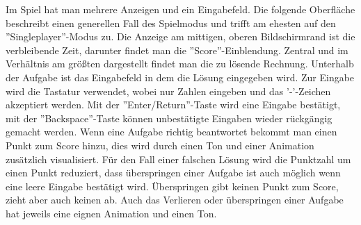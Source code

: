Im Spiel hat man mehrere Anzeigen und ein Eingabefeld. Die folgende Oberfläche beschreibt einen generellen Fall des Spielmodus und trifft am ehesten auf den ''Singleplayer''-Modus zu. Die Anzeige am mittigen, oberen Bildschirmrand ist die verbleibende Zeit, darunter findet man die ''Score''-Einblendung. Zentral und im Verhältnis am größten dargestellt findet man die zu lösende Rechnung. Unterhalb der Aufgabe ist das Eingabefeld in dem die Lösung eingegeben wird. Zur Eingabe wird die Tastatur verwendet, wobei nur Zahlen eingeben und das '-'-Zeichen akzeptiert werden. Mit der ''Enter/Return''-Taste wird eine Eingabe bestätigt, mit der ''Backspace''-Taste können unbestätigte Eingaben wieder rückgängig gemacht werden. Wenn eine Aufgabe richtig beantwortet bekommt man einen Punkt zum Score hinzu, dies wird durch einen Ton und einer Animation zusätzlich visualisiert. Für den Fall einer falschen Lösung wird die Punktzahl um einen Punkt reduziert, dass überspringen einer Aufgabe ist auch möglich wenn eine leere Eingabe bestätigt wird. Überspringen gibt keinen Punkt zum Score, zieht aber auch keinen ab. Auch das Verlieren oder überspringen einer Aufgabe hat jeweils eine eignen Animation und einen Ton.

